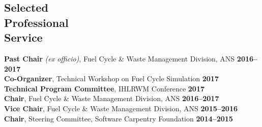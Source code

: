 \documentclass[margin,line]{resume}
\begin{document}
\begin{resume}
    \section{\mysidestyle Selected\\Professional\\Service}
    \textbf{Past Chair} \emph{(ex officio)}, Fuel Cycle \& Waste Management Division, ANS  \hfill \textbf{2016--2017}\vspace{.5mm}\\%
		\textbf{Co-Organizer}, Technical Workshop on Fuel Cycle Simulation \hfill \textbf{2017}\vspace{.5mm}\\%
		\textbf{Technical Program Committee}, IHLRWM Conference \hfill \textbf{2017}\vspace{.5mm}\\%
		\textbf{Chair}, Fuel Cycle \& Waste Management Division, ANS  \hfill \textbf{2016--2017}\vspace{.5mm}\\%
		\textbf{Vice Chair}, Fuel Cycle \& Waste Management Division, ANS  \hfill \textbf{2015--2016}\vspace{.5mm}\\%
		\textbf{Chair}, Steering Committee, Software Carpentry Foundation   \hfill \textbf{2014--2015}\vspace{.5mm}\\%

\end{resume}
\end{document}
